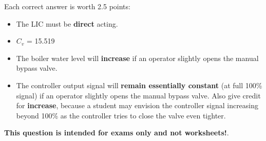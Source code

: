 





Each correct answer is worth 2.5 points:

\begin{itemize}
\item{} The LIC must be {\bf direct} acting.
\vskip 10pt
\item{} $C_v$ = 15.519
\vskip 10pt
\item{} The boiler water level will {\bf increase} if an operator slightly opens the manual bypass valve.
\vskip 10pt
\item{} The controller output signal will {\bf remain essentially constant} (at full 100\% signal) if an operator slightly opens the manual bypass valve.  Also give credit for {\bf increase}, because a student may envision the controller signal increasing beyond 100\% as the controller tries to close the valve even tighter.
\end{itemize}








{\bf This question is intended for exams only and not worksheets!}.


